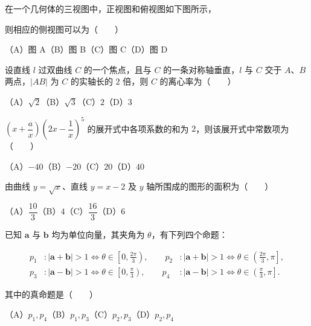 \begin{question}
在一个几何体的三视图中，正视图和俯视图如下图所示，

则相应的侧视图可以为\mbox{（　　）}
\nopagebreak[4]
\begin{center}\end{center}
\nopagebreak[4]
（A）图 A\quad（B）图 B\quad（C）图 C\quad（D）图 D

\end{question}
\begin{question}
设直线 $l$ 过双曲线 $C$ 的一个焦点，且与 $C$ 的一条对称轴垂直，$l$ 与 $C$ 交于 $A\text{、}B$ 两点，$|AB|$ 为 $C$ 的实轴长的 $2$ 倍，则 $C$ 的离心率为\mbox{（　　）}

（A）$\sqrt2$\quad（B）$\sqrt3$\quad（C）$2$\quad（D）$3$

\end{question}
\begin{question}
$(x+\dfrac ax)(2x-\dfrac1x)^5$ 的展开式中各项系数的和为 $2$，则该展开式中常数项为\mbox{（　　）}

（A）$-40$\quad（B）$-20$\quad（C）$20$\quad（D）$40$

\end{question}
\begin{question}
由曲线 $y=\sqrt{x}$、直线 $y=x-2$ 及 $y$ 轴所围成的图形的面积为\mbox{（　　）}

（A）$\dfrac{10}{3}$\quad（B）$4$\quad（C）$\dfrac{16}{3}$\quad（D）$6$

\end{question}
\begin{question}
已知 $\boldsymbol a$ 与 $\boldsymbol b$ 均为单位向量，其夹角为 $\theta$，有下列四个命题：

\nopagebreak[4]
\[
\begin{aligned}
p_1 &: |\boldsymbol a+\boldsymbol b|>1\Longleftrightarrow \theta\in\left[0,\frac{2\pi}{3}\right),\qquad
p_2 &: |\boldsymbol a+\boldsymbol b|>1\Longleftrightarrow \theta\in\left(\frac{2\pi}{3},\pi\right],\\
p_3 &: |\boldsymbol a-\boldsymbol b|>1\Longleftrightarrow \theta\in\left[0,\frac\pi3\right),\qquad
p_4 &: |\boldsymbol a-\boldsymbol b|>1\Longleftrightarrow \theta\in\left(\frac\pi3,\pi\right].
\end{aligned}
\]

其中的真命题是\mbox{（　　）}

（A）$p_1,p_4$\quad（B）$p_1,p_3$\quad（C）$p_2,p_3$\quad（D）$p_2,p_4$

\end{question}
